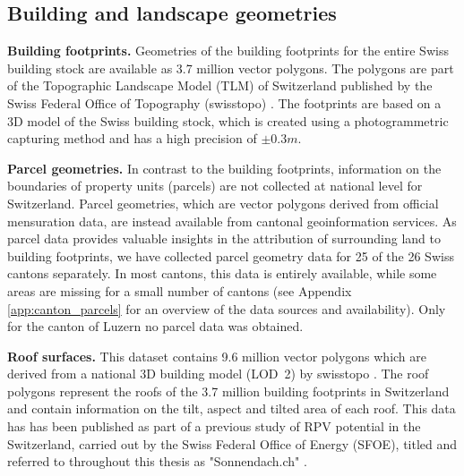 \subsection{Building and landscape geometries}
\label{data_geometry}

\textbf{Building footprints.} 
Geometries of the building footprints for the entire Swiss building stock are available as 3.7 million vector polygons. 
The polygons are part of the Topographic Landscape Model (TLM) of Switzerland published by the Swiss Federal Office of Topography (swisstopo) \cite{swisstopo_swisstlm3d_2018}. 
The footprints are based on a 3D model of the Swiss building stock, which is created using a photogrammetric capturing method and has a high precision of $\pm 0.3 m$.

\textbf{Parcel geometries.}
In contrast to the building footprints, information on the boundaries of property units (parcels) are not collected at national level for Switzerland. 
Parcel geometries, which are vector polygons derived from official mensuration data, are instead available from cantonal geoinformation services. 
As parcel data provides valuable insights in the attribution of surrounding land to building footprints, we have collected parcel geometry data for 25 of the 26 Swiss cantons separately.
In most cantons, this data is entirely available, while some areas are missing for a small number of cantons (see Appendix \ref{app:canton_parcels} for an overview of the data sources and availability). Only for the canton of Luzern no parcel data was obtained.

\textbf{Roof surfaces.}
This dataset contains 9.6 million vector polygons which are derived from a national 3D building model (LOD~2) by swisstopo \cite{klauser_solarpotentialanalyse_2016}.
The roof polygons represent the roofs of the 3.7 million building footprints in Switzerland and contain information  on the tilt, aspect and tilted area of each roof.
This data has has been published as part of a previous study of RPV potential in the Switzerland, carried out by the Swiss Federal Office of Energy (SFOE), titled and referred to throughout this thesis as "Sonnendach.ch" \cite{klauser_solarpotentialanalyse_2016}.

